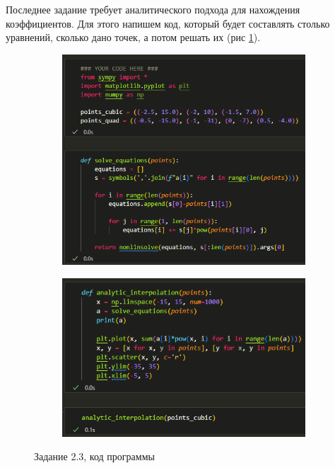 \documentclass[14pt,a4paper]{extarticle}
\begin{document}
        Последнее задание требует аналитического подхода для нахождения
коэффициентов. Для этого напишем код, который будет составлять столько
уравнений, сколько дано точек, а потом решать их (рис \ref{fig:2.3-code}).

\begin{figure}[h!]
    \begin{subfigure}{.5\textwidth}
        \centering
        \includegraphics[width=0.9\linewidth]{figures/2.3-code1.png}
    \end{subfigure}%
    \begin{subfigure}{.5\textwidth}
        \centering
        \includegraphics[width=0.9\linewidth]{figures/2.3-code2.png}
    \end{subfigure}

    \caption{Задание 2.3, код программы}
    \label{fig:2.3-code}
\end{figure}
\end{document}

